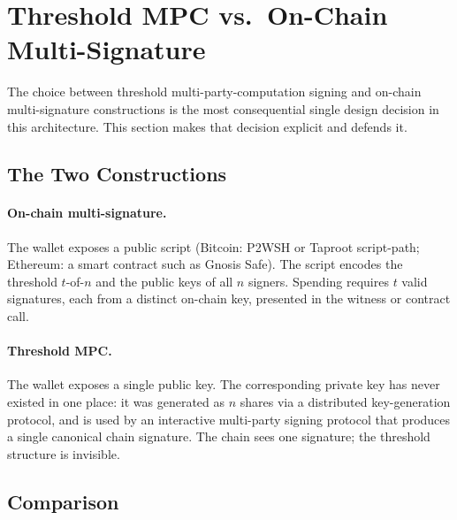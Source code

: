 \section{Threshold MPC vs.\ On-Chain Multi-Signature}

\label{sec:mpc-vs-multisig}

The choice between threshold multi-party-computation signing and
on-chain multi-signature constructions is the most consequential
single design decision in this architecture. This section makes that
decision explicit and defends it.

\subsection{The Two Constructions}

\paragraph{On-chain multi-signature.} The wallet exposes a public
script (Bitcoin: P2WSH or Taproot script-path; Ethereum: a smart
contract such as Gnosis Safe). The script encodes the threshold
$t$-of-$n$ and the public keys of all $n$ signers. Spending requires
$t$ valid signatures, each from a distinct on-chain key, presented in
the witness or contract call.

\paragraph{Threshold MPC.} The wallet exposes a single public key.
The corresponding private key has never existed in one place: it was
generated as $n$ shares via a distributed key-generation protocol,
and is used by an interactive multi-party signing protocol that
produces a single canonical chain signature. The chain sees one
signature; the threshold structure is invisible.

\subsection{Comparison}

